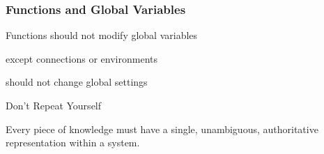 \documentclass[12pt]{beamer}\usepackage[]{graphicx}\usepackage[]{color}
\begin{document}
\begin{frame}
\frametitle{Functions and Global Variables}

\bi
 \item Functions should not modify global variables
 \item except connections or environments
 \item should not change global  settings
\ei

\end{frame}


\begin{frame}
\begin{center}
\Huge{}
\end{center}
\end{frame}


\begin{frame}
\begin{center}
\Huge{Don't Repeat Yourself}
\end{center}
\end{frame}


\begin{frame}
\begin{center}
\Large{Every piece of knowledge must have a single, unambiguous, authoritative representation within a system.}
\end{center}
\end{frame}

\end{document}
